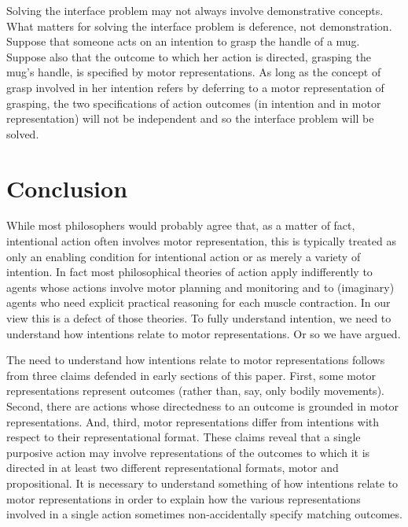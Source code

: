 \documentclass[12pt,\papersize]{extarticle}
\begin{document}
Solving the interface problem may not always involve demonstrative concepts. What matters for solving the interface problem is deference, not demonstration. Suppose that someone acts on an intention to grasp the handle of a mug.  Suppose also that the outcome to which her action is directed, grasping the mug's handle, is specified by motor representations. As long as the concept of grasp involved in her intention refers by deferring to a motor representation of grasping, the two specifications of action outcomes (in intention and in motor representation) will not be independent and so the interface problem will be solved.


\section{Conclusion}

While most philosophers would probably agree that, as a matter of fact, intentional action often involves motor representation, this is typically treated as only an enabling condition for intentional action or as merely a variety of intention. In fact most philosophical theories of action apply indifferently to agents whose actions involve motor planning and monitoring and to (imaginary) agents who need explicit practical reasoning for each muscle contraction. In our view this is a defect of those theories. To fully understand intention, we need to understand how intentions relate to motor representations.  Or so we have argued.  

The need to understand how intentions relate to motor representations follows from three claims defended in early sections of this paper. First, some motor representations represent outcomes (rather than, say, only bodily movements). Second, there are actions whose directedness to an outcome is grounded in motor representations. And, third, motor representations differ from intentions with respect to their representational format. These claims reveal that a single purposive action may involve representations of the outcomes to which it is directed in at least two different representational formats, motor and propositional. It is necessary to understand something of how intentions relate to motor representations in order to explain how the various representations involved in a single action sometimes non-accidentally specify matching outcomes.
\end{document}
